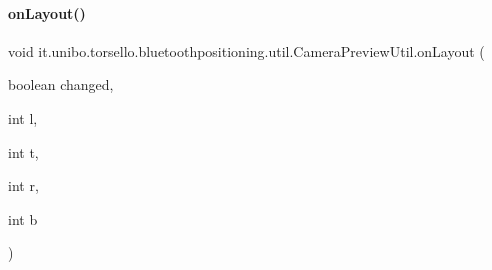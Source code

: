 \paragraph{\texorpdfstring{on\+Layout()}{onLayout()}}
{\footnotesize\ttfamily void it.\+unibo.\+torsello.\+bluetoothpositioning.\+util.\+Camera\+Preview\+Util.\+on\+Layout (\begin{DoxyParamCaption}\item[{boolean}]{changed,  }\item[{int}]{l,  }\item[{int}]{t,  }\item[{int}]{r,  }\item[{int}]{b }\end{DoxyParamCaption})\hspace{0.3cm}{\ttfamily [protected]}}


